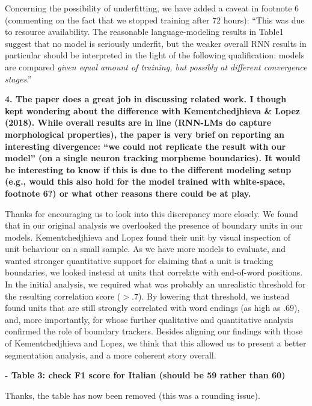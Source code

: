 \documentclass{article}[11pt,a4paper,oneside]
\begin{document}
Concerning the possibility of underfitting, we have added a caveat in footnote 6 (commenting on the fact that we stopped training after 72 hours):  ``This was due to resource availability. The reasonable language-modeling results in Table1 suggest that no model is seriously underfit, but the weaker overall RNN results in particular should be interpreted in the light of the following qualification:  models are compared \emph{given equal amount of training, but possibly at different convergence stages}.''
\newline

\textbf{4. The paper does a great job in discussing related work. I though kept wondering about the difference with Kementchedjhieva \& Lopez (2018). While overall results are in line (RNN-LMs do capture morphological properties), the paper is very brief on reporting an interesting divergence: ``we could not replicate the result with our model'' (on a single neuron tracking morpheme boundaries). It would be interesting to know if this is due to the different modeling setup (e.g., would this also hold for the model trained with white-space, footnote 6?) or what other reasons there could be at play.}

Thanks for encouraging us to look into this discrepancy more closely. We found that in our original analysis we overlooked the presence of boundary units in our models. Kementchedjhieva and Lopez found their unit by visual inspection of unit behaviour on a small sample. As we have more models to evaluate, and wanted stronger quantitative support for claiming that a unit is tracking boundaries, we looked instead at units that correlate with end-of-word positions. In the initial analysis, we required what was probably an unrealistic threshold for the resulting correlation score ($>.7$). By lowering that threshold, we instead found units that are still strongly correlated with word endings (as high as $.69$), and, more importantly, for whose further qualitative and quantitative analysis confirmed the role of boundary trackers. Besides aligning our findings with those of Kementchedjhieva and Lopez, we think that this allowed us to present a better segmentation analysis, and a more coherent story overall.
\newline

\textbf{- Table 3: check F1 score for Italian (should be 59 rather than 60)}

Thanks, the table has now been removed (this was a rounding issue).
\newline
\end{document}
